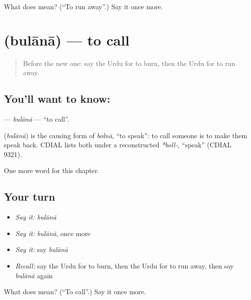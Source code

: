 \begin{tcolorbox}[breakable,colback=teal!4,colframe=teal!35!black,title={Before you move on}]
What does  mean? (\textquotedblleft{}To run away\textquotedblright{}.) Say it once more.
\end{tcolorbox}
\section[\texorpdfstring{\ur{بلانا} (bulānā)}{بلانا (bulānā)}]{ (bulānā) — to call}

\label{lesson:UR-C139-bulana}



\begin{quote}
Before the new one: say the Urdu for to burn, then the Urdu for to run away.
\end{quote}

\subsection*{You'll want to know: }
\textbf{} — \emph{bulānā} — \textquotedblleft{}to call\textquotedblright{}.

\begin{cousinweb}
\textbf{} (\emph{bulānā}) is the causing form of \emph{bolnā}, \textquotedblleft{}to speak\textquotedblright{}: to call someone is to make them speak back. CDIAL lists both under a reconstructed \emph{*boll-}, \textquotedblleft{}speak\textquotedblright{} (CDIAL 9321).
\end{cousinweb}

\begin{grammarlens}[title={What you've built}]
One more word for this chapter.
\end{grammarlens}

\subsection*{Your turn}
\begin{itemize}
\raggedright
  \item \emph{Say it:} \emph{bulānā}
  \item \emph{Say it:} \emph{bulānā}, once more
  \item \emph{Say it:} say \emph{bulānā}
  \item \emph{Recall:} say the Urdu for to burn, then the Urdu for to run away, then say \emph{bulānā} again
\end{itemize}

\begin{tcolorbox}[breakable,colback=teal!4,colframe=teal!35!black,title={Before you move on}]
What does  mean? (\textquotedblleft{}To call\textquotedblright{}.) Say it once more.
\end{tcolorbox}
